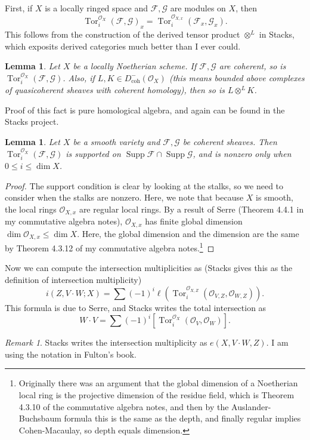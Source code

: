 \documentclass[leqno, openany]{memoir}
\newtheorem{lem}[thm]{Lemma}
\theoremstyle{definition}
\theoremstyle{remark}
\newtheorem{rmk}[thm]{Remark}
\theoremstyle{plain}
\theoremstyle{definition}
\theoremstyle{remark}
\newcommand{\mc}[1]{\mathcal{#1}}
\newcommand{\mr}[1]{\mathrm{#1}}
\DeclareMathOperator{\Supp}{Supp}
\DeclareMathOperator{\Tor}{Tor}
\begin{document}
First, if $X$ is a locally ringed space and $\mc{F}, \mc{G}$ are modules on $X$, then 
\[ {\Tor_i^{\mc{O}_X}(\mc{F}, \mc{G})}_x = \Tor_i^{\mc{O}_{X,x}}(\mc{F}_x, \mc{G}_x). \]
This follows from the construction of the derived tensor product $\otimes^L$ in Stacks, which exposits derived categories much better than I ever could.

\begin{lem}
    Let $X$ be a locally Noetherian scheme. If $\mc{F}, \mc{G}$ are coherent, so is $\Tor_i^{\mc{O}_X}(\mc{F}, \mc{G})$. Also, if $L, K \in D^-_{\mr{coh}}(\mc{O}_X)$ (this means bounded above complexes of quasicoherent sheaves with coherent homology), then so is $L \otimes^L K$.
\end{lem}

Proof of this fact is pure homological algebra, and again can be found in the Stacks project.

\begin{lem}
    Let $X$ be a smooth variety and $\mc{F}, \mc{G}$ be coherent sheaves. Then $\Tor_i^{\mc{O}_X}(\mc{F}, \mc{G})$ is supported on $\Supp \mc{F} \cap \Supp \mc{G}$, and is nonzero only when $0 \leq i \leq \dim X$.
\end{lem}

\begin{proof}
    The support condition is clear by looking at the stalks, so we need to consider when the stalks are nonzero. Here, we note that because $X$ is smooth, the local rings $\mc{O}_{X,x}$ are regular local rings. By a result of Serre (Theorem 4.4.1 in my commutative algebra notes), $\mc{O}_{X,x}$ has finite global dimension $\dim \mc{O}_{X,x} \leq \dim X$. Here, the global dimension and the dimension are the same by Theorem 4.3.12 of my commutative algebra notes.\footnote{Originally there was an argument that the global dimension of a Noetherian local ring is the projective dimension of the residue field, which is Theorem 4.3.10 of the commutative algebra notes, and then by the Auslander-Buchsbaum formula this is the same as the depth, and finally regular implies Cohen-Macaulay, so depth equals dimension.}
\end{proof}

Now we can compute the intersection multiplicities as (Stacks gives this as the definition of intersection multiplicity)
\[ i(Z, V \cdot W; X) = \sum {(-1)}^i \ell( \Tor_i^{\mc{O}_{X,Z}} (\mc{O}_{V,Z}, \mc{O}_{W,Z}) ). \]
This formula is due to Serre, and Stacks writes the total intersection as
\[ W \cdot V = \sum {(-1)}^i [\Tor_i^{\mc{O}_X}(\mc{O}_V, \mc{O}_W)]. \]
\begin{rmk}
    Stacks writes the intersection multiplicity as $e(X, V \cdot W, Z)$. I am using the notation in Fulton's book.
\end{rmk}
\end{document}
